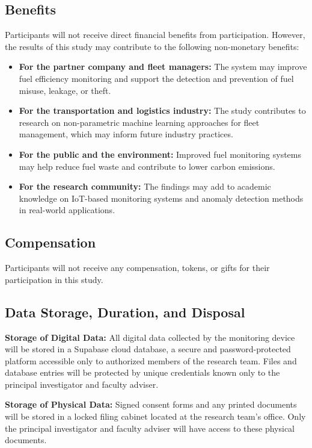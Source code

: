 \subsection{Benefits}

Participants will not receive direct financial benefits from participation. However, the results of this study may contribute to the following non-monetary benefits:

\begin{itemize}
    \item \textbf{For the partner company and fleet managers:} The system may improve fuel efficiency monitoring and support the detection and prevention of fuel misuse, leakage, or theft.
    \item \textbf{For the transportation and logistics industry:} The study contributes to research on non-parametric machine learning approaches for fleet management, which may inform future industry practices.
    \item \textbf{For the public and the environment:} Improved fuel monitoring systems may help reduce fuel waste and contribute to lower carbon emissions.
    \item \textbf{For the research community:} The findings may add to academic knowledge on IoT-based monitoring systems and anomaly detection methods in real-world applications.
\end{itemize}

\subsection{Compensation}

Participants will not receive any compensation, tokens, or gifts for their participation in this study.

\subsection{Data Storage, Duration, and Disposal}

\textbf{Storage of Digital Data:} All digital data collected by the monitoring device will be stored in a Supabase cloud database, a secure and password-protected platform accessible only to authorized members of the research team. Files and database entries will be protected by unique credentials known only to the principal investigator and faculty adviser.

\textbf{Storage of Physical Data:} Signed consent forms and any printed documents will be stored in a locked filing cabinet located at the research team's office. Only the principal investigator and faculty adviser will have access to these physical documents.

